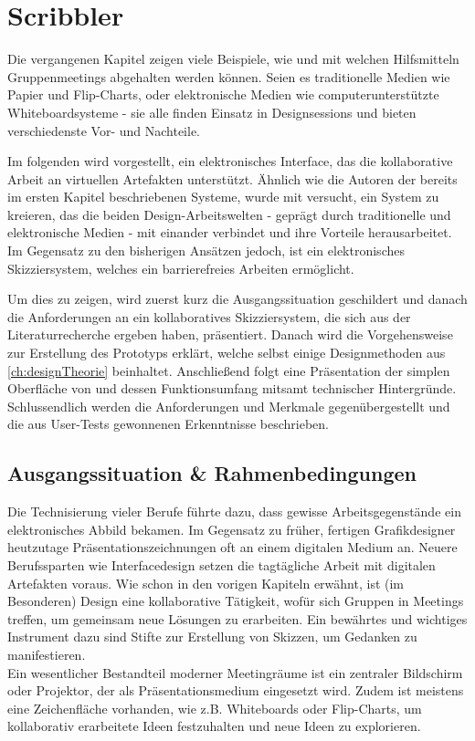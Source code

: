 \chapter{Scribbler}\label{ch:scribbler}

Die vergangenen Kapitel zeigen viele Beispiele, wie und mit welchen Hilfsmitteln Gruppenmeetings abgehalten werden können. Seien es traditionelle Medien wie Papier und Flip-Charts, oder elektronische Medien wie computerunterstützte Whiteboardsysteme - sie alle finden Einsatz in Designsessions und bieten verschiedenste Vor- und Nachteile.

\medskip Im folgenden wird \scribbler vorgestellt, ein elektronisches Interface, das die kollaborative Arbeit an virtuellen Artefakten unterstützt. Ähnlich wie die Autoren der bereits im ersten Kapitel beschriebenen Systeme, wurde mit \scribbler versucht, ein System zu kreieren, das die beiden Design-Arbeitswelten - geprägt durch traditionelle und elektronische Medien - mit einander verbindet und ihre Vorteile herausarbeitet. Im Gegensatz zu den bisherigen Ansätzen jedoch, ist \scribbler ein elektronisches Skizziersystem, welches ein barrierefreies Arbeiten ermöglicht.

\medskip Um dies zu zeigen, wird zuerst kurz die Ausgangssituation geschildert und danach die Anforderungen an ein kollaboratives Skizziersystem, die sich aus der Literaturrecherche ergeben haben, präsentiert. Danach wird die Vorgehensweise zur Erstellung des Prototyps erklärt, welche selbst einige Designmethoden aus \autoref{ch:designTheorie} beinhaltet. Anschließend folgt eine Präsentation der simplen Oberfläche von \scribbler und dessen Funktionsumfang mitsamt technischer Hintergründe. Schlussendlich werden die Anforderungen und Merkmale gegenübergestellt und die aus User-Tests gewonnenen Erkenntnisse beschrieben.

\section{Ausgangssituation \& Rahmenbedingungen} \label{sec:ausgangssituation}
Die Technisierung vieler Berufe führte dazu, dass gewisse Arbeitsgegenstände ein elektronisches Abbild bekamen. Im Gegensatz zu früher, fertigen Grafikdesigner heutzutage Präsentationszeichnungen oft an einem digitalen Medium an. Neuere Berufssparten wie Interfacedesign setzen die tagtägliche Arbeit mit digitalen Artefakten voraus. Wie schon in den vorigen Kapiteln erwähnt, ist (im Besonderen) Design eine kollaborative Tätigkeit, wofür sich Gruppen in Meetings treffen, um gemeinsam neue Lösungen zu erarbeiten. Ein bewährtes und wichtiges Instrument dazu sind Stifte zur Erstellung von Skizzen, um Gedanken zu manifestieren.\\
Ein wesentlicher Bestandteil moderner Meetingräume ist ein zentraler Bildschirm oder Projektor, der als Präsentationsmedium eingesetzt wird. Zudem ist meistens eine Zeichenfläche vorhanden, wie z.B. Whiteboards oder Flip-Charts, um kollaborativ erarbeitete Ideen festzuhalten und neue Ideen zu explorieren.

